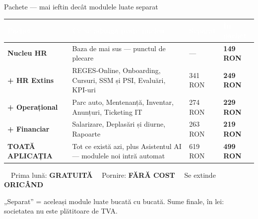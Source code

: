\documentclass[aspectratio=169,11pt,t,xcolor={table}]{beamer}
\begin{document}
\begin{frame}{Pachete — mai ieftin decât modulele luate separat}
  \vspace{-2pt}
  \setlength{\tabcolsep}{5pt}
  \renewcommand{\arraystretch}{1.15}
  {\scriptsize
  \begin{tabular}{@{}>{\raggedright\arraybackslash}p{2.5cm}
                    >{\raggedright\arraybackslash}p{6.8cm}
                    >{\raggedleft\arraybackslash}p{1.9cm}
                    >{\raggedleft\arraybackslash}p{2.0cm}@{}}
    \rowcolor{brandNavy}
    \textcolor{white}{\bfseries Pachet} &
    \textcolor{white}{\bfseries Ce se adaugă peste nucleu} &
    \textcolor{white}{\bfseries Separat} &
    \textcolor{white}{\bfseries În pachet} \\
    \midrule
    \textbf{Nucleu HR} & Baza de mai sus — punctul de plecare &
      \textcolor{brandSlate}{---} & {\bfseries\normalsize\color{brandBlue} 149 RON} \\
    \rowcolor{brandMist}
    \textbf{+ HR Extins} & REGES-Online, Onboarding, Cursuri, SSM și PSI, Evaluări,
      KPI-uri & \textcolor{brandSlate}{341 RON} &
      {\bfseries\normalsize\color{brandBlue} 249 RON} \\
    \textbf{+ Operațional} & Parc auto, Mentenanță, Inventar, Anunțuri, Ticketing IT
      & \textcolor{brandSlate}{274 RON} &
      {\bfseries\normalsize\color{brandBlue} 229 RON} \\
    \rowcolor{brandMist}
    \textbf{+ Financiar} & Salarizare, Deplasări și diurne, Rapoarte &
      \textcolor{brandSlate}{263 RON} &
      {\bfseries\normalsize\color{brandBlue} 219 RON} \\
    \textbf{TOATĂ APLICAȚIA} & Tot ce există azi, plus Asistentul AI — modulele noi
      intră automat & \textcolor{brandSlate}{619 RON} &
      {\bfseries\normalsize\color{brandGreen} 499 RON} \\
    \bottomrule
  \end{tabular}}
  \vspace{6pt}
  \begin{tcolorbox}[enhanced,arc=3pt,colback=brandGreen!8,colframe=brandGreen,
      boxrule=1pt,left=8pt,right=8pt,top=4pt,bottom=4pt]
    \footnotesize
    \textcolor{brandGreen}{}~~Prima lună: \textbf{GRATUITĂ}\hfill
    \textcolor{brandGreen}{}~~Pornire: \textbf{FĂRĂ COST}\hfill
    \textcolor{brandGreen}{}~~Se extinde \textbf{ORICÂND}
  \end{tcolorbox}
  \vspace{4pt}
  {\scriptsize\color{brandSlate}
  „Separat” = aceleași module luate bucată cu bucată. Sume finale, în lei:
  societatea nu este plătitoare de TVA.}
\end{frame}
\end{document}
